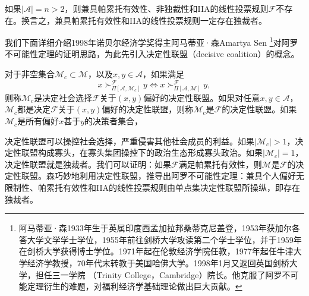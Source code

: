 \begin{theorem}[阿罗不可能性定理]
如果$|\mathcal A|=n>2$，则兼具帕累托有效性、非独裁性和IIA的线性投票规则$\mathcal F$不存在。换言之，兼具帕累托有效性和IIA的线性投票规则一定存在独裁者。
\end{theorem}

我们下面详细介绍1998年诺贝尔经济学奖得主阿马蒂亚·森Amartya Sen
\footnote{阿马蒂亚·森1933年生于英属印度西孟加拉邦桑蒂克尼盖登，1953年获加尔各答大学文学学士学位，1955年前往剑桥大学攻读第二个学士学位，并于1959年在剑桥大学获得博士学位。1971年起在伦敦经济学院任教，1977年起任牛津大学经济学教授，70年代末转教于美国哈佛大学。1998年1月又返回英国剑桥大学，担任三一学院
（Trinity College，Cambridge）院长。他克服了阿罗不可能定理衍生的难题，对福利经济学基础理论做出巨大贡献。}对阿罗不可能性定理的证明思路，为此先引入决定性联盟（decisive coalition）的概念。

\begin{definition}[决定性联盟]
对于非空集合$\mathcal M_c\subset \mathcal M$，以及$x,y\in \mathcal A$，如果满足
\begin{equation}
    x\succ_{\Pi[\mathcal A, \mathcal M_c]}^{\mathcal F} y \Leftrightarrow x\succ_{\Pi[\mathcal A, \mathcal M]}^{\mathcal F} y,
\end{equation}
则称$\mathcal M_c$是决定社会选择$\mathcal F$关于$(x,y)$偏好的决定性联盟。如果对任意$x,y\in \mathcal A$，$\mathcal M_c$都是决定$\mathcal F$关于$(x,y)$偏好的决定性联盟，则称$\mathcal M_c$是$\mathcal F$的决定性联盟。如果$\mathcal M_c$是所有偏好$x$甚于$y$的决策者集合，
\end{definition}
决定性联盟可以操控社会选择，严重侵害其他社会成员的利益。如果$|\mathcal M_c|>1$，决定性联盟构成寡头，在寡头集团操控下的政治生态形成寡头政治。如果$|\mathcal M_c|=1$，决定性联盟就是独裁者。我们可以证明：如果$\mathcal F$满足帕累托有效性，则$\mathcal M$是$\mathcal F$的决定性联盟。森巧妙地利用决定性联盟，推导出阿罗不可能性定理：兼具个人偏好无限制性、帕累托有效性和IIA的线性投票规则由单点集决定性联盟所操纵，即存在独裁者。

